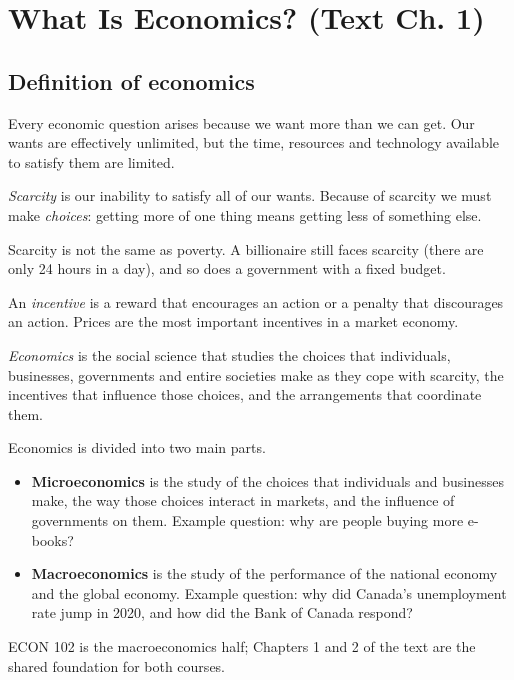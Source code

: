 \chapter{What Is Economics? (Text Ch. 1)}

\section{Definition of economics}

Every economic question arises because we want more than we can get. Our wants are
effectively unlimited, but the time, resources and technology available to satisfy them
are limited.

\begin{definition}[Scarcity]
\emph{Scarcity} is our inability to satisfy all of our wants. Because of scarcity we must
make \emph{choices}: getting more of one thing means getting less of something else.
\end{definition}

Scarcity is not the same as poverty. A billionaire still faces scarcity (there are only
24 hours in a day), and so does a government with a fixed budget.

\begin{definition}[Incentive]
An \emph{incentive} is a reward that encourages an action or a penalty that discourages an
action. Prices are the most important incentives in a market economy.
\end{definition}

\begin{definition}[Economics]
\emph{Economics} is the social science that studies the choices that individuals,
businesses, governments and entire societies make as they cope with scarcity, the
incentives that influence those choices, and the arrangements that coordinate them.
\end{definition}

Economics is divided into two main parts.
\begin{itemize}
  \item \textbf{Microeconomics} is the study of the choices that individuals and
        businesses make, the way those choices interact in markets, and the influence of
        governments on them. Example question: why are people buying more e-books?
  \item \textbf{Macroeconomics} is the study of the performance of the national economy
        and the global economy. Example question: why did Canada's unemployment rate jump
        in 2020, and how did the Bank of Canada respond?
\end{itemize}
ECON 102 is the macroeconomics half; Chapters 1 and 2 of the text are the shared
foundation for both courses.

